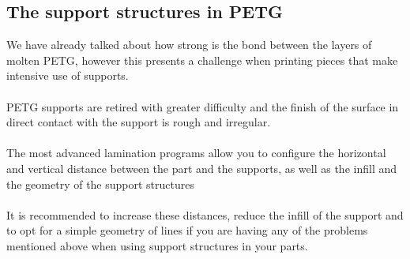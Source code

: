\documentclass[11pt,a4paper]{article}
\begin{document}
	\subsection{The support structures in PETG}We have already talked about how strong is the bond between the layers of molten PETG, however this presents a challenge when printing pieces that make intensive use of supports.
\\\\
PETG supports are retired with greater difficulty and the finish of the surface in direct contact with the support is rough and irregular.
\\\\
The most advanced lamination programs allow you to configure the horizontal and vertical distance between the part and the supports, as well as the infill and the geometry of the support structures
\\\\
It is recommended to increase these distances, reduce the infill of the support and to opt for a simple geometry of lines if you are having any of the problems mentioned above when using support structures in your parts.
\end{document}
